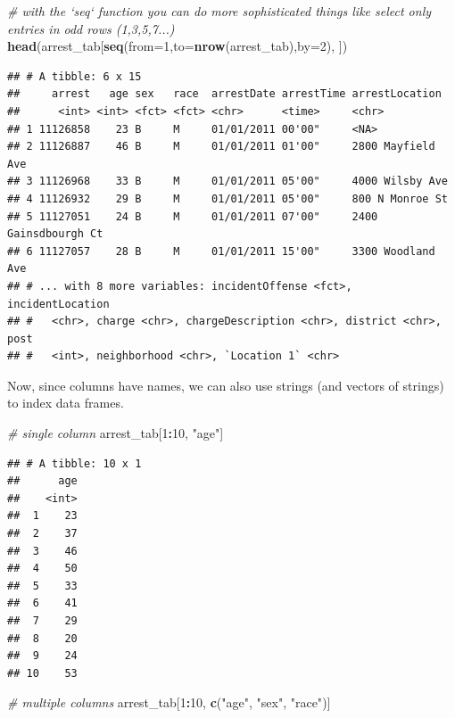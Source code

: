 \documentclass[12pt,]{book}
\newenvironment{Shaded}{\begin{snugshade}}{\end{snugshade}}
\newcommand{\KeywordTok}[1]{\textcolor[rgb]{0.13,0.29,0.53}{\textbf{#1}}}
\newcommand{\DataTypeTok}[1]{\textcolor[rgb]{0.13,0.29,0.53}{#1}}
\newcommand{\DecValTok}[1]{\textcolor[rgb]{0.00,0.00,0.81}{#1}}
\newcommand{\StringTok}[1]{\textcolor[rgb]{0.31,0.60,0.02}{#1}}
\newcommand{\CommentTok}[1]{\textcolor[rgb]{0.56,0.35,0.01}{\textit{#1}}}
\newcommand{\OperatorTok}[1]{\textcolor[rgb]{0.81,0.36,0.00}{\textbf{#1}}}
\newcommand{\NormalTok}[1]{#1}
\theoremstyle{definition}
\theoremstyle{definition}
\theoremstyle{definition}
\theoremstyle{remark}
\begin{document}
\begin{Shaded}
\begin{Highlighting}[]
\CommentTok{# with the `seq` function you can do more sophisticated things like select only entries in odd rows (1,3,5,7...)}
\KeywordTok{head}\NormalTok{(arrest_tab[}\KeywordTok{seq}\NormalTok{(}\DataTypeTok{from=}\DecValTok{1}\NormalTok{,}\DataTypeTok{to=}\KeywordTok{nrow}\NormalTok{(arrest_tab),}\DataTypeTok{by=}\DecValTok{2}\NormalTok{), ])}
\end{Highlighting}
\end{Shaded}

\begin{verbatim}
## # A tibble: 6 x 15
##     arrest   age sex   race  arrestDate arrestTime arrestLocation      
##      <int> <int> <fct> <fct> <chr>      <time>     <chr>               
## 1 11126858    23 B     M     01/01/2011 00'00"     <NA>                
## 2 11126887    46 B     M     01/01/2011 01'00"     2800 Mayfield Ave   
## 3 11126968    33 B     M     01/01/2011 05'00"     4000 Wilsby Ave     
## 4 11126932    29 B     M     01/01/2011 05'00"     800 N Monroe St     
## 5 11127051    24 B     M     01/01/2011 07'00"     2400 Gainsdbourgh Ct
## 6 11127057    28 B     M     01/01/2011 15'00"     3300 Woodland Ave   
## # ... with 8 more variables: incidentOffense <fct>, incidentLocation
## #   <chr>, charge <chr>, chargeDescription <chr>, district <chr>, post
## #   <int>, neighborhood <chr>, `Location 1` <chr>
\end{verbatim}

Now, since columns have names, we can also use strings (and vectors of
strings) to index data frames.

\begin{Shaded}
\begin{Highlighting}[]
\CommentTok{# single column}
\NormalTok{arrest_tab[}\DecValTok{1}\OperatorTok{:}\DecValTok{10}\NormalTok{, }\StringTok{"age"}\NormalTok{]}
\end{Highlighting}
\end{Shaded}

\begin{verbatim}
## # A tibble: 10 x 1
##      age
##    <int>
##  1    23
##  2    37
##  3    46
##  4    50
##  5    33
##  6    41
##  7    29
##  8    20
##  9    24
## 10    53
\end{verbatim}

\begin{Shaded}
\begin{Highlighting}[]
\CommentTok{# multiple columns}
\NormalTok{arrest_tab[}\DecValTok{1}\OperatorTok{:}\DecValTok{10}\NormalTok{, }\KeywordTok{c}\NormalTok{(}\StringTok{"age"}\NormalTok{, }\StringTok{"sex"}\NormalTok{, }\StringTok{"race"}\NormalTok{)]}
\end{Highlighting}
\end{Shaded}
\end{document}
